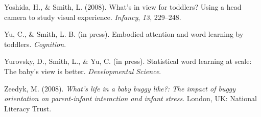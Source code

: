 \documentclass[a4paper,man,apacite,floatsintext,longtable]{apa6}
\begin{document}
\hypertarget{ref-yoshida2008}{}
Yoshida, H., \& Smith, L. (2008). What's in view for toddlers? Using a
head camera to study visual experience. \emph{Infancy}, \emph{13},
229--248.

\hypertarget{ref-yuinpress}{}
Yu, C., \& Smith, L. B. (in press). Embodied attention and word learning
by toddlers. \emph{Cognition}.

\hypertarget{ref-yurovsky2012}{}
Yurovsky, D., Smith, L., \& Yu, C. (in press). Statistical word learning
at scale: The baby's view is better. \emph{Developmental Science}.

\hypertarget{ref-zeedyk2008}{}
Zeedyk, M. (2008). \emph{What's life in a baby buggy like?: The impact
of buggy orientation on parent-infant interaction and infant stress}.
London, UK: National Literacy Trust.


\end{document}
